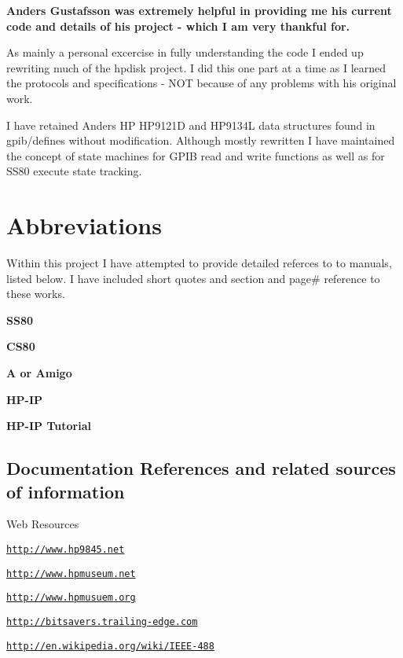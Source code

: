 {\bfseries Anders Gustafsson was extremely helpful in providing me his current code and details of his project -\/ which I am very thankful for.}

As mainly a personal excercise in fully understanding the code I ended up rewriting much of the hpdisk project. I did this one part at a time as I learned the protocols and specifications -\/ N\-O\-T because of any problems with his original work.

I have retained Anders H\-P H\-P9121\-D and H\-P9134\-L data structures found in gpib/defines without modification. Although mostly rewritten I have maintained the concept of state machines for G\-P\-I\-B read and write functions as well as for S\-S80 execute state tracking.



 \section*{Abbreviations}

Within this project I have attempted to provide detailed referces to to manuals, listed below. I have included short quotes and section and page\# reference to these works.
\begin{DoxyItemize}
\item {\bfseries S\-S80}
\item {\bfseries C\-S80}
\item {\bfseries A or Amigo}
\item {\bfseries H\-P-\/\-I\-P}
\item {\bfseries H\-P-\/\-I\-P Tutorial}
\end{DoxyItemize}

\subsection*{Documentation References and related sources of information}


\begin{DoxyItemize}
\item Web Resources
\begin{DoxyItemize}
\item \href{http://www.hp9845.net}{\tt http\-://www.\-hp9845.\-net}
\item \href{http://www.hpmuseum.net}{\tt http\-://www.\-hpmuseum.\-net}
\item \href{http://www.hpmusuem.org}{\tt http\-://www.\-hpmusuem.\-org}
\item \href{http://bitsavers.trailing-edge.com}{\tt http\-://bitsavers.\-trailing-\/edge.\-com}
\item \href{http://en.wikipedia.org/wiki/IEEE-488}{\tt http\-://en.\-wikipedia.\-org/wiki/\-I\-E\-E\-E-\/488}
\end{DoxyItemize}
\end{DoxyItemize}


